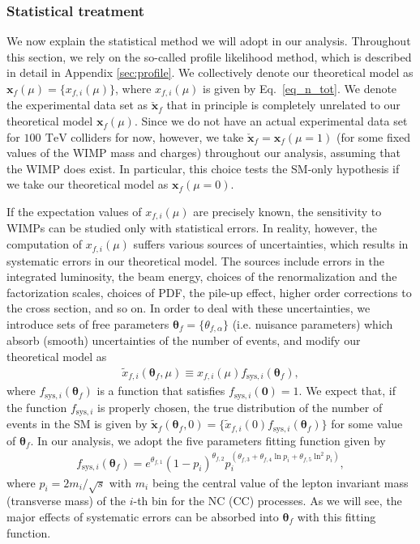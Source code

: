 \documentclass[12pt,twoside,book]{article}
\begin{document}
\subsubsection{Statistical treatment}
\label{sec_statistical}

We now explain the statistical method we will adopt in our analysis.
Throughout this section, we rely on the so-called profile likelihood method, which is described in detail in Appendix \ref{sec:profile}.
We collectively denote our theoretical model as $\bm{x}_f(\mu) = \{ x_{f,i} (\mu) \}$, where $x_{f,i}(\mu)$ is given by Eq.~\eqref{eq_n_tot}.
We denote the experimental data set as $\check{\bm{x}}_f$ that in principle is completely unrelated to our theoretical model $\bm{x}_f(\mu)$.
Since we do not have an actual experimental data set for $100~\,\mathrm{TeV}$ colliders for now, however, we take $\check{\bm{x}}_f = \bm{x}_f(\mu = 1)$ (for some fixed values of the WIMP mass and charges) throughout our analysis, assuming that the WIMP does exist.  In particular, this choice tests the SM-only hypothesis if we take our theoretical model as $\bm{x}_f(\mu=0)$.

If the expectation values of $x_{f,i} (\mu)$ are precisely known, the sensitivity to WIMPs can be studied only with statistical errors.
In reality, however, the computation of $x_{f,i} (\mu)$ suffers various sources of uncertainties, which results in systematic errors in our theoretical model.
The sources include errors in the integrated luminosity, the beam energy, choices of the renormalization and the factorization scales, choices of PDF, the pile-up effect, higher order corrections to the cross section, and so on.
In order to deal with these uncertainties, we introduce sets of free parameters $\bm{\theta}_f = \{ \theta_{f,\alpha} \}$ (i.e. nuisance parameters) which absorb (smooth) uncertainties of the number of events, and modify our theoretical model as
\begin{align}
  \tilde{x}_{f,i} (\bm{\theta}_f, \mu) \equiv x_{f,i} (\mu)
  f_{\mathrm{sys}, i}(\bm{\theta}_f),\label{eq_xtilde}
\end{align}
where $f_{\mathrm{sys}, i}(\bm{\theta}_f)$ is a function that satisfies $f_{\mathrm{sys}, i}(\bm{0}) =1$.
We expect that, if the function $f_{\mathrm{sys}, i}$ is properly chosen, the true distribution of the number of events in the SM is given by $\tilde{\bm{x}}_f (\bm{\theta}_f,0) = \{ \tilde{x}_{f,i} (0) f_{\mathrm{sys}, i}(\bm{\theta}_f)\}$ for some value of $\bm{\theta}_f$.
In our analysis, we adopt the five parameters fitting function given by~\cite{Aaltonen:2008dn}
\begin{align}
  f_{\mathrm{sys}, i} (\bm{\theta}_f) =
  e^{\theta_{f,1}} (1 - p_i)^{\theta_{f,2}}
  p_i^{(\theta_{f,3} + \theta_{f,4} \ln p_i + \theta_{f,5} \ln^2 p_i)},
  \label{eq_f_theta}
\end{align}
where $p_i = 2m_{i} / \sqrt{s}$ with $m_i$ being the central value of the lepton invariant mass (transverse mass) of the $i$-th bin for the NC (CC) processes.
As we will see, the major effects of systematic errors can be absorbed into $\bm{\theta}_f$ with this fitting function.
\end{document}
